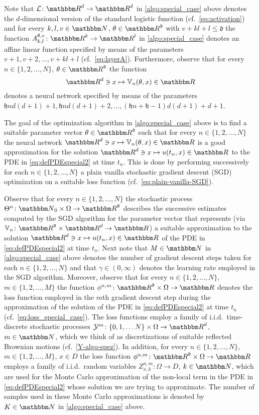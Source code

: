 %	
Note that $\mathcal L\colon \R^d\to\R^d$ in \cref{algo:special_case} above denotes the $d$-dimensional version of the standard logistic function (cf.~\cref{eq:activation}) and for every $k,l,v\in\N$, $\theta\in\R^{\mathfrak d}$ with $v+kl+l\leq\mathfrak d$ the function $A^{\theta,v}_{k,l}\colon \R^k\to\R^l$ in \cref{algo:special_case} denotes an affine linear function specified by means of the parameters $v+1,v+2,\dots,v+kl+l$ (cf.~\cref{eq:layerA}). Furthermore, observe that for every $n\in\{1,2,\dots,N\}$, $\theta\in\R^{\mathfrak d}$ the function 
\begin{equation}
\R^d\ni x\mapsto \mathbb V_n(\theta,x)\in\R
\end{equation}
denotes a neural network specified by means of the parameters $\mathfrak hnd(d+1)+1, \mathfrak hnd(d+1)+2,\dots,(\mathfrak hn+\mathfrak h-1)d(d+1)+d+1$. 

The goal of the optimization algorithm in \cref{algo:special_case} above is to find a suitable parameter vector $\theta\in\R^{\mathfrak d}$ such that for every $n\in\{1,2,\dots,N\}$ the neural network $\R^d\ni x\mapsto \mathbb V_n(\theta,x)\in\R$ is a good approximation for the solution $\R^d\ni x\mapsto u(t_n,x)\in \R$ to the PDE in \cref{eq:defPDEspecial2} at time $t_n$.
This is done by performing successively for each $n\in\{1,2,\dots,N\}$ a plain vanilla stochastic gradient descent (SGD) optimization on a suitable loss function (cf.~\cref{eq:plain-vanilla-SGD}). 

Observe that for every $n\in\{1,2,\dots,N\}$ the stochastic process $\Theta^n\colon \N_0\times \Omega\to\R^{\mathfrak d}$ describes the successive estimates computed by the SGD algorithm for the parameter vector that represents (via $\mathbb V_n\colon \R^{\mathfrak d}\times\R^d\to\R$) a suitable approximation to the solution $\R^d\ni x\mapsto u(t_n,x)\in \R$ of the PDE in \cref{eq:defPDEspecial2} at time $t_n$.
%
Next note that $M\in\N$ in \cref{algo:special_case} above denotes the number of gradient descent steps taken for each $n\in\{1,2,\dots,N\}$ and that $\gamma\in(0,\infty)$ denotes the learning rate employed in the SGD algorithm. Moreover, observe that for every $n\in\{1,2,\dots,N\}$, $m\in\{1,2,\dots,M\}$ the function $\phi^{n,m}\colon \R^{\mathfrak d}\times\Omega\to\R$ denotes the loss function employed in the $m$th gradient descent step during the approximation of the solution of the PDE in \cref{eq:defPDEspecial2} at time $t_n$ (cf.~\cref{eq:loss_special_case}). The loss functions employ a family of i.i.d.\ time-discrete stochastic processes $\mathcal Y^m\colon \{0,1,\dots N\}\times\Omega\to\R^d$, $m\in\N$, which we think of as discretizations of suitable reflected Brownian motions (cf.~\cref{Y-algo-spez}). In addition, for every $n\in\{1,2,\dots,N\}$, $m\in\{1,2,\dots,M\}$, $x\in D$ the loss function $\phi^{n,m}\colon \R^{\mathfrak d}\times\Omega\to\R$ employs a family of i.i.d.~random variables $Z^{n,m}_{x,k}\colon \Omega\to D$, $k\in\N$, which are used for the Monte Carlo approximation of the non-local term in the PDE in \cref{eq:defPDEspecial2} whose solution we are trying to approximate. The number of samples used in these Monte Carlo approximations is denoted by $K\in\N$ in \cref{algo:special_case} above.

